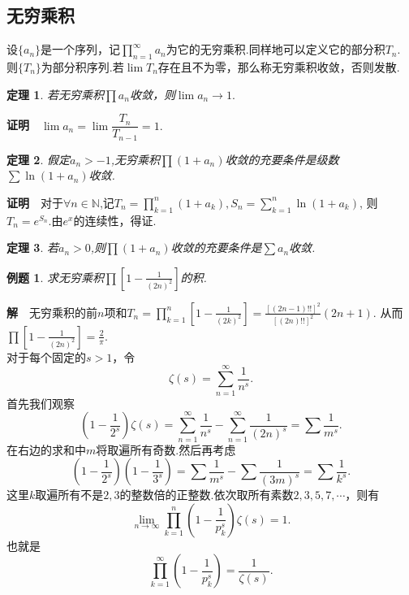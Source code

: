 \documentclass[UTF8]{article}
\newcommand{\zm}{\textbf{证明}$\quad$}
\newcommand{\jie}{\textbf{解}$\quad$}
\newtheorem{thm}{\hspace{2em}定理}[section]
\newtheorem{exa}{\hspace{2em}例题}[section]
\begin{document}
\subsection{无穷乘积}
设$\{a_n\}$是一个序列，记$\prod\limits_{n=1}^\infty a_n$为它的无穷乘积.同样地可以定义它的部分积$T_n$.
则$\{T_n\}$为部分积序列.若$\lim T_n$存在且不为零，那么称无穷乘积收敛，否则发散.
\begin{thm}
  若无穷乘积$\prod a_n$收敛，则$\lim a_n\to 1.$
\end{thm}
\zm $\lim a_n=\lim\dfrac{T_n}{T_{n-1}}=1.$
\begin{thm}
  假定$a_n>-1$,无穷乘积$\prod(1+a_n)$收敛的充要条件是级数$\sum \ln(1+a_n)$收敛.
\end{thm}
\zm 对于$\forall n\in\mathbb{N}$,记$T_n=\prod\limits_{k=1}^n(1+a_k),S_n=\sum\limits_{k=1}^n\ln(1+a_k)$,
则$T_n=e^{S_n}.$由$e^x$的连续性，得证.
\begin{thm}
  若$a_n>0$,则$\prod(1+a_n)$收敛的充要条件是$\sum a_n$收敛.
\end{thm}
\begin{exa}
  求无穷乘积$\prod[1-\frac{1}{(2n)^2}]$的积.
\end{exa}
\jie 无穷乘积的前$n$项和$T_n=\prod_{k=1}^n[1-\frac{1}{(2k)^2}]=\frac{[(2n-1)!!]^2}{[(2n)!!]^2}(2n+1)$.
从而$\prod[1-\frac{1}{(2n)^2}]=\frac{2}{\pi}.$\\
对于每个固定的$s>1$，令
$$\zeta(s)=\sum_{n=1}^\infty\frac{1}{n^s}.$$
首先我们观察
$$(1-\frac{1}{2^s})\zeta(s)=\sum_{n=1}^\infty\frac{1}{n^s}-\sum_{n=1}^\infty\frac{1}{(2n)^s}=\sum\frac{1}{m^s}.$$
在右边的求和中$m$将取遍所有奇数.然后再考虑
$$(1-\frac{1}{2^s})(1-\frac{1}{3^s})=\sum\frac{1}{m^s}-\sum\frac{1}{(3m)^s}=\sum\frac{1}{k^s}.$$
这里$k$取遍所有不是$2,3$的整数倍的正整数.依次取所有素数$2,3,5,7,\cdots$，则有
$$\lim_{n\to\infty}\prod_{k=1}^n(1-\frac{1}{p_k^s})\zeta(s)=1.$$
也就是
$$\prod_{k=1}^\infty(1-\frac{1}{p_k^s})=\frac{1}{\zeta(s)}.$$
\clearpage
\end{document}
